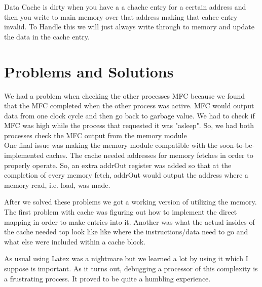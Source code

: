 \documentclass[12pt, twocolumn]{scrartcl}
\begin{document}
Data Cache is dirty when you have a a chache entry for a certain address and then you write to main memory over that address making that cahce entry invalid.  To Handle this we will just always write through to memory and update the data in the cache entry. \\

\section*{Problems and Solutions}
We had a problem when checking the other processes MFC because we found that the MFC completed when the other process was active.  MFC would output data from one clock cycle and then go back to garbage value. We had to check if MFC was high while the process that requested it was "asleep". So, we had both processes check the MFC output from the memory module\\

One final issue was making the memory module compatible with the soon-to-be-implemented caches. The cache needed addresses for memory fetches in order to properly operate. So, an extra addrOut register was added so that at the completion of every memory fetch, addrOut would output the address where a memory read, i.e. load, was made.

After we solved these problems we got a working version of utilizing the memory. \\

The first problem with cache was figuring out how to implement the direct mapping in order to make entries into it. 
Another was what the actual insides of the cache needed top look like like where the instructions/data need to go and what else were included within a cache block.

As usual using Latex was a nightmare but we learned a lot by using it which I suppose is important.
As it turns out, debugging a processor of this complexity is a frustrating process. It proved to be quite a humbling experience.
\end{document}

